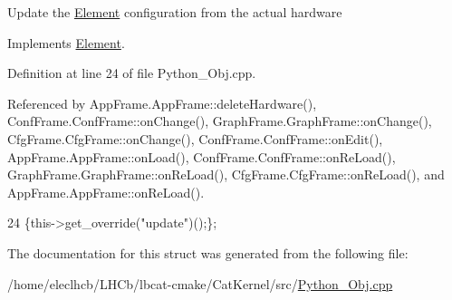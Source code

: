 Update the \hyperlink{classElement}{Element} configuration from the actual hardware 

Implements \hyperlink{classElement_a4e6c83efae95616ebddd03c793a26661}{Element}.



Definition at line 24 of file Python\+\_\+\+Obj.\+cpp.



Referenced by App\+Frame.\+App\+Frame\+::delete\+Hardware(), Conf\+Frame.\+Conf\+Frame\+::on\+Change(), Graph\+Frame.\+Graph\+Frame\+::on\+Change(), Cfg\+Frame.\+Cfg\+Frame\+::on\+Change(), Conf\+Frame.\+Conf\+Frame\+::on\+Edit(), App\+Frame.\+App\+Frame\+::on\+Load(), Conf\+Frame.\+Conf\+Frame\+::on\+Re\+Load(), Graph\+Frame.\+Graph\+Frame\+::on\+Re\+Load(), Cfg\+Frame.\+Cfg\+Frame\+::on\+Re\+Load(), and App\+Frame.\+App\+Frame\+::on\+Re\+Load().


\begin{DoxyCode}
24 \{this->get\_override(\textcolor{stringliteral}{"update"})();\};
\end{DoxyCode}


The documentation for this struct was generated from the following file\+:\begin{DoxyCompactItemize}
\item 
/home/eleclhcb/\+L\+H\+Cb/lbcat-\/cmake/\+Cat\+Kernel/src/\hyperlink{Python__Obj_8cpp}{Python\+\_\+\+Obj.\+cpp}\end{DoxyCompactItemize}
